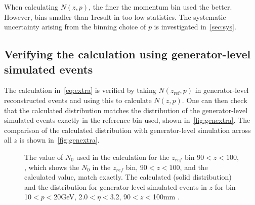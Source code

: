 When calculating $N(z,p)$, the finer the momentum bin used the better. However, bins smaller than 1\gevc result in too low statistics. The systematic uncertainty arising from the binning choice of $p$ is investigated in~\autoref{sec:sys}.





\subsection{Verifying the calculation using generator-level simulated events}
\label{sec:ver}
The calculation in~\autoref{eq:extra} is verified by taking $N(z_{\textrm{ref}},p)$ in generator-level reconstructed events and using this to calculate $N(z,p)$. One can then check that the calculated distribution matches the distribution of the generator-level simulated events exactly in the reference bin used, shown in~\autoref{fig:genextra}\protect{}. The comparison of the calculated distribution with generator-level simulation across all $z$ is shown in~\autoref{fig:genextra}\protect{}. %

\begin{figure}
\begin{center}


\end{center}
\caption{The value of $N_{0}$ used in the calculation for the $z_{ref}$ bin $90<z<100$\mm, \protect{}, which shows the $N_{0}$ in the $z_{ref}$ bin, $90<z<100$\mm, and the calculated value, match exactly. The calculated (solid distribution) and the distribution for generator-level simulated events in $z$ for bin 10$<p<$20\:GeV, 2.0$<\eta<$3.2, 90$<z<$100\:mm \protect{}.
  \label{fig:genextra}}
\end{figure}

